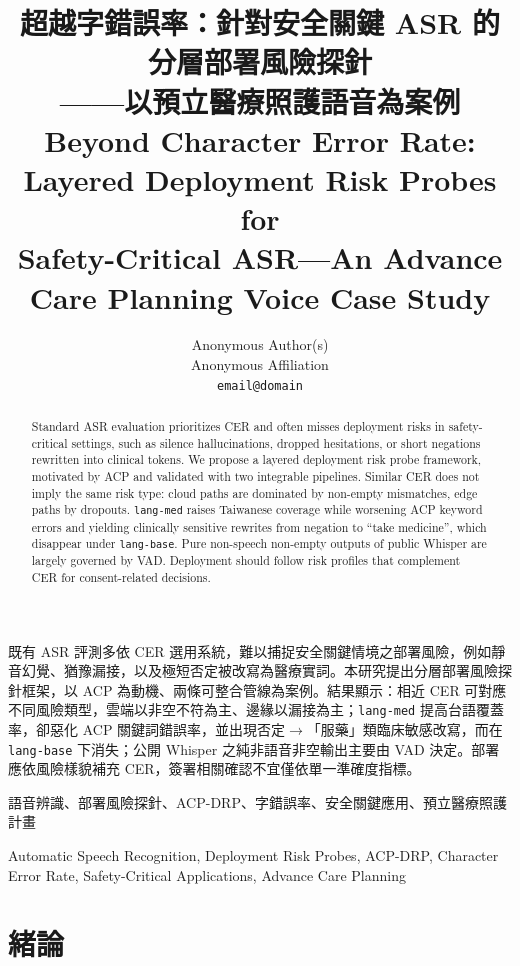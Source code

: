 \documentclass[11pt,a4paper]{article}
\title{超越字錯誤率：針對安全關鍵 ASR 的分層部署風險探針\\——以預立醫療照護語音為案例 \\
  Beyond Character Error Rate: Layered Deployment Risk Probes for\\ Safety-Critical ASR---An Advance Care Planning Voice Case Study}
\author{Anonymous Author(s) \\
  Anonymous Affiliation \\
  \texttt{email@domain} \\}
\date{}
\begin{document}
\maketitle

\begin{abstractChinese}
既有 ASR 評測多依 CER 選用系統，難以捕捉安全關鍵情境之部署風險，例如靜音幻覺、猶豫漏接，以及極短否定被改寫為醫療實詞。本研究提出分層部署風險探針框架，以 ACP 為動機、兩條可整合管線為案例。結果顯示：相近 CER 可對應不同風險類型，雲端以非空不符為主、邊緣以漏接為主；\texttt{lang-med} 提高台語覆蓋率，卻惡化 ACP 關鍵詞錯誤率，並出現否定$\rightarrow$「服藥」類臨床敏感改寫，而在 \texttt{lang-base} 下消失；公開 Whisper 之純非語音非空輸出主要由 VAD 決定。部署應依風險樣貌補充 CER，簽署相關確認不宜僅依單一準確度指標。
\end{abstractChinese}

\begin{abstract}
Standard ASR evaluation prioritizes CER and often misses deployment risks in safety-critical settings, such as silence hallucinations, dropped hesitations, or short negations rewritten into clinical tokens. We propose a layered deployment risk probe framework, motivated by ACP and validated with two integrable pipelines. Similar CER does not imply the same risk type: cloud paths are dominated by non-empty mismatches, edge paths by dropouts. \texttt{lang-med} raises Taiwanese coverage while worsening ACP keyword errors and yielding clinically sensitive rewrites from negation to ``take medicine'', which disappear under \texttt{lang-base}. Pure non-speech non-empty outputs of public Whisper are largely governed by VAD. Deployment should follow risk profiles that complement CER for consent-related decisions.
\end{abstract}

\begin{keywordsChinese}
語音辨識、部署風險探針、ACP-DRP、字錯誤率、安全關鍵應用、預立醫療照護計畫
\end{keywordsChinese}

\begin{keywords}
Automatic Speech Recognition, Deployment Risk Probes, ACP-DRP, Character Error Rate, Safety-Critical Applications, Advance Care Planning
\end{keywords}

\section{緒論}
\end{document}
